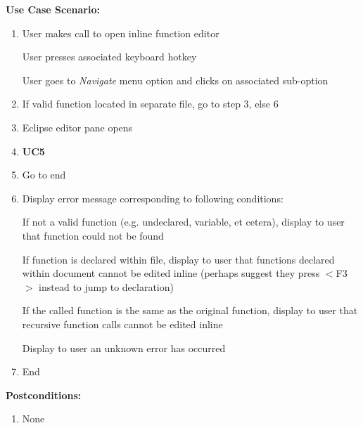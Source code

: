 \documentclass[]{report}
\begin{document}
			\noindent\textbf{Use Case Scenario:}
			
				\begin{enumerate}
					
					\item
					User makes call to open inline function editor
					
						\subitem
						User presses associated keyboard hotkey
						
						\subitem
						User goes to \textit{Navigate} menu option and clicks on associated sub-option
					
					\item 
					If valid function located in separate file, go to step 3, else 6
					
					\item
					Eclipse editor pane opens
					
					\item 
					\textbf{UC5}
					
					\item 
					Go to end
					
					\item
					Display error message corresponding to following conditions:
					
						\subitem
						If not a valid function (e.g. undeclared, variable, et cetera), display to user that function could not be found
						
						\subitem 
						If function is declared within file, display to user that functions declared within document cannot be edited inline (perhaps suggest they press $<$F3$>$ instead to jump to declaration)
						
						\subitem
						If the called function is the same as the original function, display to user that recursive function calls cannot be edited inline
						
						\subitem
						Display to user an unknown error has occurred
					
					\item 
					End
					
				\end{enumerate}
			
			\noindent\textbf{Postconditions:}
			
				\begin{enumerate}
					
					\item 
					None
					
				\end{enumerate}
			
\end{document}
